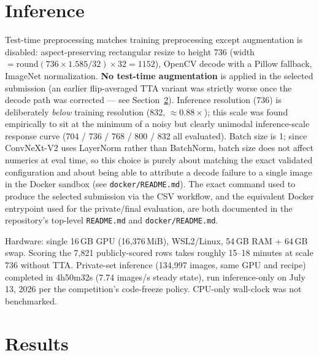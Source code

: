 \documentclass[11pt,a4paper]{article}
\begin{document}
\section{Inference}
\label{sec:inference}
Test-time preprocessing matches training preprocessing except augmentation is
disabled: aspect-preserving rectangular resize to height 736 (width $=
\mathrm{round}(736 \times 1.585 / 32) \times 32 = 1152$), OpenCV decode with a
Pillow fallback, ImageNet normalization. \textbf{No test-time augmentation} is
applied in the selected submission (an earlier flip-averaged TTA variant was
strictly worse once the decode path was corrected — see
Section~\ref{sec:results}). Inference resolution (736) is deliberately
\emph{below} training resolution (832, $\approx 0.88\times$); this scale was
found empirically to sit at the minimum of a noisy but clearly unimodal
inference-scale response curve (704 / 736 / 768 / 800 / 832 all evaluated).
Batch size is 1; since ConvNeXt-V2 uses LayerNorm rather than BatchNorm,
batch size does not affect numerics at eval time, so this choice is purely
about matching the exact validated configuration and about being able to
attribute a decode failure to a single image in the Docker sandbox (see
\texttt{docker/README.md}). The exact command used to produce the selected
submission via the CSV workflow, and the equivalent Docker entrypoint used
for the private/final evaluation, are both documented in the repository's
top-level \texttt{README.md} and \texttt{docker/README.md}.

Hardware: single 16\,GB GPU (16{,}376\,MiB), WSL2/Linux, 54\,GB RAM + 64\,GB
swap. Scoring the 7{,}821 publicly-scored rows takes roughly 15--18 minutes
at scale 736 without TTA. Private-set inference (134{,}997 images, same GPU
and recipe) completed in 4h50m32s (7.74 images/s steady state), run
inference-only on July 13, 2026 per the competition's code-freeze policy.
CPU-only wall-clock was not benchmarked.

\section{Results}
\label{sec:results}
\end{document}

